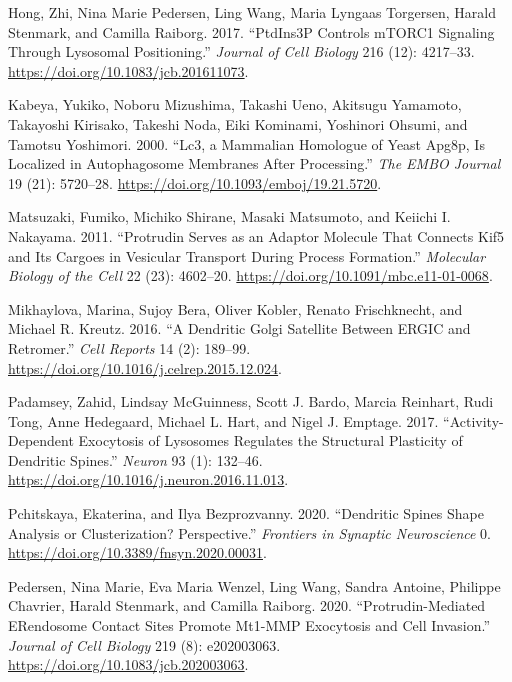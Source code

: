 \documentclass[
]{article}
\newlength{\cslhangindent}
\newlength{\cslentryspacingunit} %
\newenvironment{CSLReferences}[2] %
 {%
  \setlength{\parindent}{0pt}
  \ifodd #1
  \let\oldpar\par
  \def\par{\hangindent=\cslhangindent\oldpar}
  \fi
  \setlength{\parskip}{#2\cslentryspacingunit}
 }%
 {}
\begin{document}
\begin{CSLReferences}{1}{0}
\leavevmode{}%
Hong, Zhi, Nina Marie Pedersen, Ling Wang, Maria Lyngaas Torgersen,
Harald Stenmark, and Camilla Raiborg. 2017. {``{PtdIns3P} Controls
{mTORC1} Signaling Through Lysosomal Positioning.''} \emph{Journal of
Cell Biology} 216 (12): 4217--33.
\url{https://doi.org/10.1083/jcb.201611073}.

\leavevmode{}%
Kabeya, Yukiko, Noboru Mizushima, Takashi Ueno, Akitsugu Yamamoto,
Takayoshi Kirisako, Takeshi Noda, Eiki Kominami, Yoshinori Ohsumi, and
Tamotsu Yoshimori. 2000. {``{Lc3}, a Mammalian Homologue of Yeast
{Apg8p}, Is Localized in Autophagosome Membranes After Processing.''}
\emph{The EMBO Journal} 19 (21): 5720--28.
\url{https://doi.org/10.1093/emboj/19.21.5720}.

\leavevmode{}%
Matsuzaki, Fumiko, Michiko Shirane, Masaki Matsumoto, and Keiichi I.
Nakayama. 2011. {``Protrudin Serves as an Adaptor Molecule That Connects
{Kif5} and Its Cargoes in Vesicular Transport During Process
Formation.''} \emph{Molecular Biology of the Cell} 22 (23): 4602--20.
\url{https://doi.org/10.1091/mbc.e11-01-0068}.

\leavevmode{}%
Mikhaylova, Marina, Sujoy Bera, Oliver Kobler, Renato Frischknecht, and
Michael R. Kreutz. 2016. {``A {Dendritic Golgi Satellite} Between
{ERGIC} and {Retromer}.''} \emph{Cell Reports} 14 (2): 189--99.
\url{https://doi.org/10.1016/j.celrep.2015.12.024}.

\leavevmode{}%
Padamsey, Zahid, Lindsay McGuinness, Scott J. Bardo, Marcia Reinhart,
Rudi Tong, Anne Hedegaard, Michael L. Hart, and Nigel J. Emptage. 2017.
{``Activity-{Dependent Exocytosis} of {Lysosomes Regulates} the
{Structural Plasticity} of {Dendritic Spines}.''} \emph{Neuron} 93 (1):
132--46. \url{https://doi.org/10.1016/j.neuron.2016.11.013}.

\leavevmode{}%
Pchitskaya, Ekaterina, and Ilya Bezprozvanny. 2020. {``Dendritic {Spines
Shape Analysis} or {Clusterization}?
{Perspective}.''} \emph{Frontiers in Synaptic Neuroscience} 0.
\url{https://doi.org/10.3389/fnsyn.2020.00031}.

\leavevmode{}%
Pedersen, Nina Marie, Eva Maria Wenzel, Ling Wang, Sandra Antoine,
Philippe Chavrier, Harald Stenmark, and Camilla Raiborg. 2020.
{``Protrudin-Mediated {ER}\textendash endosome Contact Sites Promote
{Mt1-MMP} Exocytosis and Cell Invasion.''} \emph{Journal of Cell
Biology} 219 (8): e202003063.
\url{https://doi.org/10.1083/jcb.202003063}.


\end{CSLReferences}
\end{document}
